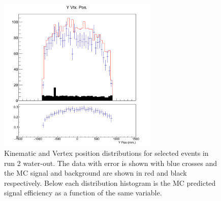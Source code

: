 \begin{figure}[h]
\includegraphics[width=3in]{Figures/TN100Plots/c_Yair_2.png}
\caption{Kinematic and Vertex position distributions for selected events in run 2 water-out. The data with error is shown with blue crosses and the MC signal and background are shown in red and black respectively.  Below each distribution histogram is the MC predicted signal efficiency as a function of the same variable.}
\label{fig:xs2run2air}
\end{figure}

